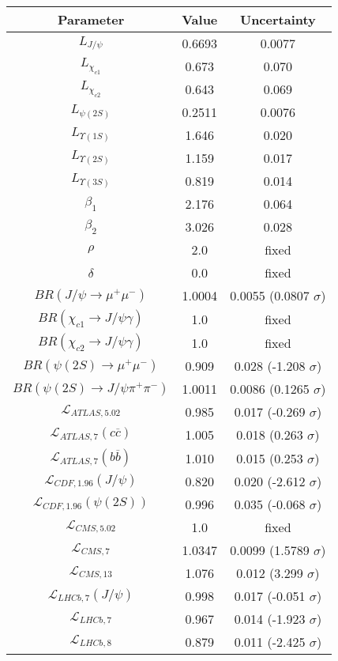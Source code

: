 \begin{table}[h!]
\centering
\begin{tabular}{c|c|c}
Parameter & Value & Uncertainty \\
\hline
$L_{J/\psi}$ & 0.6693 & 0.0077 \\
$L_{\chi_{c1}}$ & 0.673 & 0.070 \\
$L_{\chi_{c2}}$ & 0.643 & 0.069 \\
$L_{\psi(2S)}$ & 0.2511 & 0.0076 \\
$L_{\Upsilon(1S)}$ & 1.646 & 0.020 \\
$L_{\Upsilon(2S)}$ & 1.159 & 0.017 \\
$L_{\Upsilon(3S)}$ & 0.819 & 0.014 \\
$\beta_1$ & 2.176 & 0.064 \\
$\beta_2$ & 3.026 & 0.028 \\
$\rho$ & 2.0 & fixed \\
$\delta$ & 0.0 & fixed \\
$BR(J/\psi\rightarrow\mu^+\mu^-)$ & 1.0004 & 0.0055 (0.0807 $\sigma$) \\
$BR(\chi_{c1}\rightarrow J/\psi\gamma)$ & 1.0 & fixed \\
$BR(\chi_{c2}\rightarrow J/\psi\gamma)$ & 1.0 & fixed \\
$BR(\psi(2S)\rightarrow\mu^+\mu^-)$ & 0.909 & 0.028 (-1.208 $\sigma$) \\
$BR(\psi(2S)\rightarrow J/\psi\pi^+\pi^-)$ & 1.0011 & 0.0086 (0.1265 $\sigma$) \\
$\mathcal L_{ATLAS,5.02}$ & 0.985 & 0.017 (-0.269 $\sigma$) \\
$\mathcal L_{ATLAS,7}(c\overline c)$ & 1.005 & 0.018 (0.263 $\sigma$) \\
$\mathcal L_{ATLAS,7}(b\overline b)$ & 1.010 & 0.015 (0.253 $\sigma$) \\
$\mathcal L_{CDF,1.96}(J/\psi)$ & 0.820 & 0.020 (-2.612 $\sigma$) \\
$\mathcal L_{CDF,1.96}(\psi(2S))$ & 0.996 & 0.035 (-0.068 $\sigma$) \\
$\mathcal L_{CMS,5.02}$ & 1.0 & fixed \\
$\mathcal L_{CMS,7}$ & 1.0347 & 0.0099 (1.5789 $\sigma$) \\
$\mathcal L_{CMS,13}$ & 1.076 & 0.012 (3.299 $\sigma$) \\
$\mathcal L_{LHCb,7}(J/\psi)$ & 0.998 & 0.017 (-0.051 $\sigma$) \\
$\mathcal L_{LHCb,7}$ & 0.967 & 0.014 (-1.923 $\sigma$) \\
$\mathcal L_{LHCb,8}$ & 0.879 & 0.011 (-2.425 $\sigma$) \\

\end{tabular}
\end{table}
